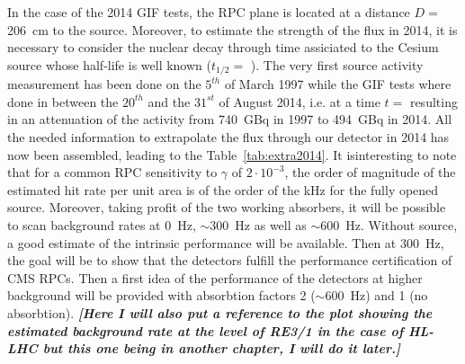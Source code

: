 			In the case of the 2014 GIF tests, the RPC plane is located at a distance $D=$\SI{206}{cm} to the source. Moreover, to estimate the strength of the flux in 2014, it is necessary to consider the nuclear decay through time assiciated to the Cesium source whose half-life is well known ($t_{1/2}=$ ). The very first source activity measurement has been done on the $5^{th}$ of March 1997 while the GIF tests where done in between the $20^{th}$ and the $31^{st}$ of August 2014, i.e. at a time $t=$  resulting in an attenuation of the activity from \SI{740}{GBq} in 1997 to \SI{494}{GBq} in 2014. All the needed information to extrapolate the flux through our detector in 2014 has now been assembled, leading to the Table~\ref{tab:extra2014}. It isinteresting to note that for a common RPC sensitivity to $\gamma$ of $2 \cdot 10^{-3}$, the order of magnitude of the estimated hit rate per unit area is of the order of the \si{kHz} for the fully opened source. Moreover, taking profit of the two working absorbers, it will be possible to scan background rates at \SI{0}{Hz}, $\sim$\SI{300}{Hz} as well as $\sim$\SI{600}{Hz}. Without source, a good estimate of the intrinsic performance will be available. Then at \SI{300}{Hz}, the goal will be to show that the detectors fulfill the performance certification of CMS RPCs. Then a first idea of the performance of the detectors at higher background will be provided with absorbtion factors 2 ($\sim$\SI{600}{Hz}) and 1 (no absorbtion). \textbf{\textit{[Here I will also put a reference to the plot showing the estimated background rate at the level of RE3/1 in the case of HL-LHC but this one being in another chapter, I will do it later.]}}
			
